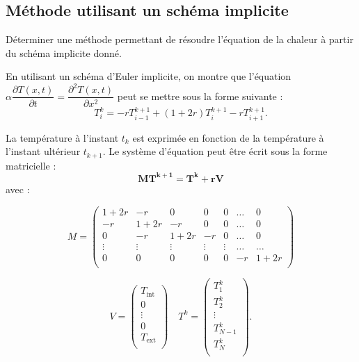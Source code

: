 \documentclass[10pt,fleqn]{article} %
\begin{document}
\begin{multicols}{2}
\subsection*{Méthode utilisant un schéma implicite}
\ifprof
\else
\begin{obj}
Déterminer une méthode permettant de résoudre l'équation de la chaleur à partir du 
schéma implicite donné.
\end{obj}

En utilisant un schéma d'Euler implicite, on montre que l'équation 
$\alpha \dfrac{\partial T(x,t)}{\partial t} = \dfrac{\partial^2 T(x,t)}{\partial x^2}$
 peut se mettre sous la forme suivante : 
$$
T_i^k = -rT_{i-1}^{k+1} + \left( 1+2r\right) T_{i}^{k+1}-rT_{i+1}^{k+1}.
$$

La température à l'instant $t_k$ est exprimée en fonction de la température à l'instant 
ultérieur $t_{k+1}$.
Le système d'équation peut être écrit sous la forme matricielle : 
\begin{equation} \label{eq_implicite}
\mathbf{M T^{k+1} = T^k + rV}
\end{equation}
avec : 

$$
M = 
\begin{pmatrix}
1+2r & -r     & 0 & 0 & 0 &  \ldots & 0 \\
-r     & 1+2r & -r & 0 & 0  & \ldots &  0 \\
0    & -r & 1+2r & -r & 0   & \ldots&  0 \\
\vdots & \vdots & \vdots & \vdots & \vdots & \ldots & \ldots \\
0& 0& 0& 0& 0& -r & 1+2r\\
\end{pmatrix}
$$

$$ 
V = \begin{pmatrix}
T_{\text{int}} \\
0 \\
\vdots \\
0 \\
T_{\text{ext}} \\
\end{pmatrix}
\quad
T^k = \begin{pmatrix}
T_1^k \\
T_2^k  \\
\vdots \\
T_{N-1}^k  \\
T_N^k \\
\end{pmatrix}.
$$

\fi



\end{multicols}
\end{document}
